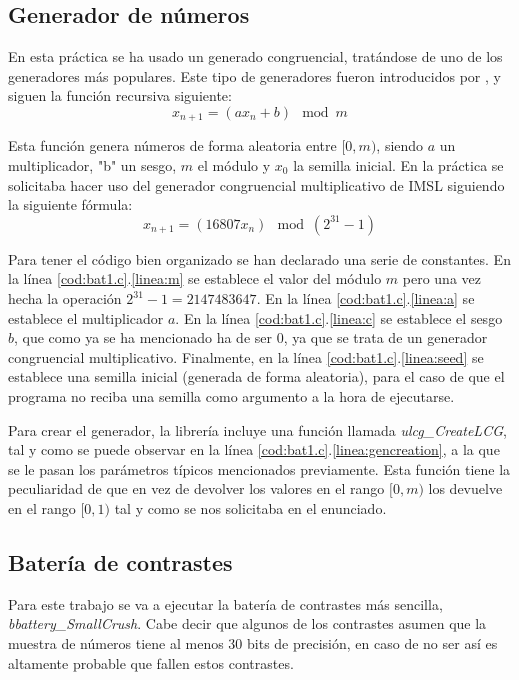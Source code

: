 \documentclass{article}
\begin{document}
\subsection{Generador de números}
En esta práctica se ha usado un generado congruencial, tratándose de uno de los generadores más populares. Este tipo de generadores fueron introducidos por \citet{Lehm51}, y siguen la función recursiva siguiente:
\begin{equation*}
    x_{n+1} = (ax_n+b) \mod m
\end{equation*}

Esta función genera números de forma aleatoria entre $[0,m)$, siendo $a$ un multiplicador, "b" un sesgo, $m$ el módulo y $x_0$ la semilla inicial. En la práctica se solicitaba hacer uso del generador congruencial multiplicativo de IMSL siguiendo la siguiente fórmula:
\begin{equation*}
    x_{n+1} = (16807x_n) \mod (2^{31}-1)
\end{equation*}

Para tener el código bien organizado se han declarado una serie de constantes. En la línea \ref{cod:bat1.c}.\ref{linea:m} se establece el valor del módulo $m$ pero una vez hecha la operación $2^{31}-1=2147483647$. En la línea \ref{cod:bat1.c}.\ref{linea:a} se establece el multiplicador $a$. En la línea \ref{cod:bat1.c}.\ref{linea:c} se establece el sesgo $b$, que como ya se ha mencionado ha de ser $0$, ya que se trata de un generador congruencial multiplicativo. Finalmente, en la línea \ref{cod:bat1.c}.\ref{linea:seed} se establece una semilla inicial (generada de forma aleatoria), para el caso de que el programa no reciba una semilla como argumento a la hora de ejecutarse.

Para crear el generador, la librería incluye una función llamada \emph{ulcg\_CreateLCG}, tal y como se puede observar en la línea \ref{cod:bat1.c}.\ref{linea:gencreation}, a la que se le pasan los parámetros típicos mencionados previamente. Esta función tiene la peculiaridad de que en vez de devolver los valores en el rango $[0, m)$ los devuelve en el rango $[0,1)$ tal y como se nos solicitaba en el enunciado.

\subsection{Batería de contrastes}

Para este trabajo se va a ejecutar la batería de contrastes más sencilla, \textit{bbattery\_SmallCrush}. Cabe decir que algunos de los contrastes asumen que la muestra de números tiene al menos 30 bits de precisión, en caso de no ser así es altamente probable que fallen estos contrastes.
\end{document}
